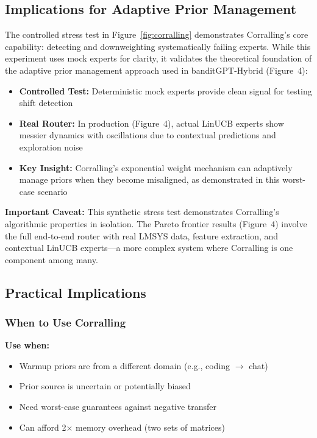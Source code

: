 \subsection{Implications for Adaptive Prior Management}

The controlled stress test in Figure~\ref{fig:corralling} demonstrates Corralling's core capability: detecting and downweighting systematically failing experts. While this experiment uses mock experts for clarity, it validates the theoretical foundation of the adaptive prior management approach used in banditGPT-Hybrid (Figure~4):

\begin{itemize}
    \item \textbf{Controlled Test:} Deterministic mock experts provide clean signal for testing shift detection
    \item \textbf{Real Router:} In production (Figure~4), actual LinUCB experts show messier dynamics with oscillations due to contextual predictions and exploration noise
    \item \textbf{Key Insight:} Corralling's exponential weight mechanism can adaptively manage priors when they become misaligned, as demonstrated in this worst-case scenario
\end{itemize}

\textbf{Important Caveat:} This synthetic stress test demonstrates Corralling's algorithmic properties in isolation. The Pareto frontier results (Figure~4) involve the full end-to-end router with real LMSYS data, feature extraction, and contextual LinUCB experts---a more complex system where Corralling is one component among many.

\subsection{Practical Implications}

\subsubsection{When to Use Corralling}

\textbf{Use when:}
\begin{itemize}
    \item Warmup priors are from a different domain (e.g., coding $\to$ chat)
    \item Prior source is uncertain or potentially biased
    \item Need worst-case guarantees against negative transfer
    \item Can afford 2$\times$ memory overhead (two sets of matrices)
\end{itemize}

